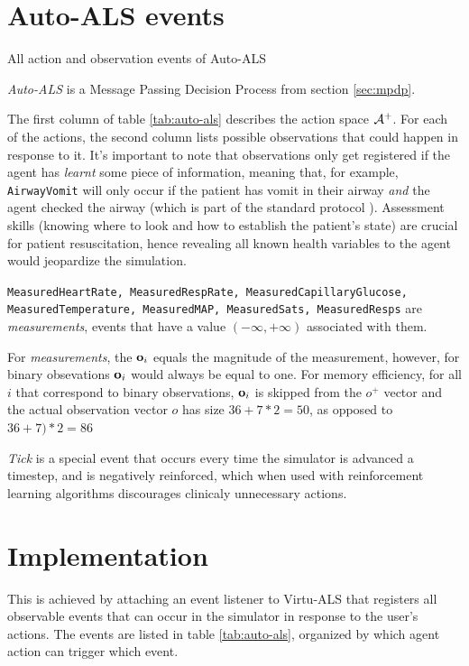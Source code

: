 \newpage
\section{Auto-ALS events}


\begin{table}

\caption{All action and observation events of Auto-ALS}
\label{tab:auto-als}
\end{table}

\emph{Auto-ALS} is a Message Passing Decision Process from section \ref{sec:mpdp}.

The first column of table \ref{tab:auto-als} describes the action space $\mathcal{A}^{+}$.
For each of the actions, the second column lists possible observations that could happen in response to it.
It's important to note that observations only get registered if the agent has \emph{learnt} some piece of information, meaning that, for example, \verb|AirwayVomit| will only occur if the patient has vomit in their airway \emph{and} the agent checked the airway (which is part of the standard protocol \cite{thimInitialAssessmentTreatment2012}).
Assessment skills (knowing where to look and how to establish the patient's state) are crucial for patient resuscitation, hence revealing all known health variables to the agent would jeopardize the simulation.

\texttt{MeasuredHeartRate, MeasuredRespRate, MeasuredCapillaryGlucose, MeasuredTemperature, MeasuredMAP, MeasuredSats, MeasuredResps} are \emph{measurements}, events that have a value $(-\infty, +\infty)$ associated with them.

For \emph{measurements}, the $\mathbf{o}_i$ equals the magnitude of the measurement, however, for binary obsevations $\mathbf{o}_i$ would always be equal to one.
For memory efficiency, for all $i$ that correspond to binary observations, $\mathbf{o}_i$ is skipped from the $o^{+} $ vector and the actual observation vector $o$ has size $36+7*2=50$, as opposed to $36+7)*2=86$

\emph{Tick} is a special event that occurs every time the simulator is advanced a timestep, and is negatively reinforced, which when used with reinforcement learning algorithms discourages clinicaly unnecessary actions.

\newpage
\section{Implementation}

This is achieved by attaching an event listener to Virtu-ALS that registers all observable events that can occur in the simulator in response to the user's actions.
The events are listed in table \ref{tab:auto-als}, organized by which agent action can trigger which event.

